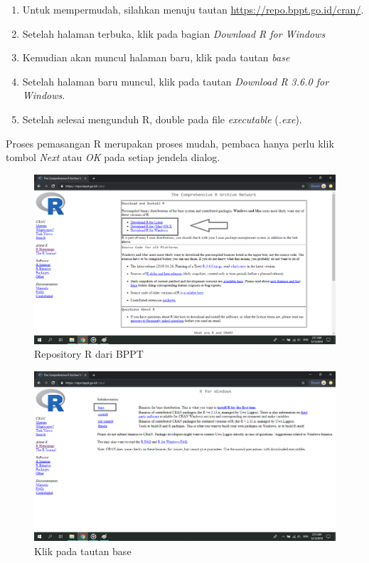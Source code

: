\documentclass[]{book}
\providecommand{\tightlist}{%
  \setlength{\itemsep}{0pt}\setlength{\parskip}{0pt}}
\begin{document}
\begin{enumerate}
\def\labelenumi{\arabic{enumi}.}
\tightlist
\item
  Untuk mempermudah, silahkan menuju tautan
  \url{https://repo.bppt.go.id/cran/}.
\item
  Setelah halaman terbuka, klik pada bagian \emph{Download R for
  Windows}
\item
  Kemudian akan muncul halaman baru, klik pada tautan \emph{base}
\item
  Setelah halaman baru muncul, klik pada tautan \emph{Download R 3.6.0
  for Windows}.
\item
  Setelah selesai mengunduh R, double pada file \emph{executable}
  (\emph{.exe}).
\end{enumerate}

Proses pemasangan R merupakan proses mudah, pembaca hanya perlu klik
tombol \emph{Next} atau \emph{OK} pada setiap jendela dialog.

\begin{figure}

{\centering \includegraphics[width=0.9\linewidth]{Gambar/r-download/06} 

}

\caption{Repository R dari BPPT}\label{fig:install-r-1}
\end{figure}

\begin{figure}

{\centering \includegraphics[width=0.9\linewidth]{Gambar/r-download/07} 

}

\caption{Klik pada tautan base}\label{fig:install-r-2}
\end{figure}
\end{document}
